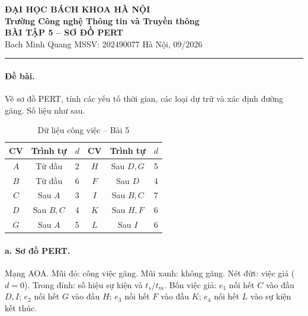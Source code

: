 \documentclass[12pt,a4paper]{article}
\begin{document}
\begin{center}
  {\large\bfseries ĐẠI HỌC BÁCH KHOA HÀ NỘI}\\[0.4pt]
  {\bfseries Trường Công nghệ Thông tin và Truyền thông}\\[3.5pt]
  {\Large\bfseries BÀI TẬP 5 -- SƠ ĐỒ PERT}\\[0.5pt]
  {\small Bach Minh Quang \quad MSSV: 202490077 \quad Hà Nội, 09/2026}
\end{center}
\vspace{-2pt}
\hrule
\vspace{5pt}

\paragraph{Đề bài.}
Vẽ sơ đồ PERT, tính các yếu tố thời gian, các loại dự trữ và xác định đường găng.
Số liệu như sau.

\begin{table}[H]\centering
\caption{Dữ liệu công việc -- Bài 5}
\small
\begin{tabular}{cccccc}
\toprule
\textbf{CV} & \textbf{Trình tự} & \textbf{$d$} &
\textbf{CV} & \textbf{Trình tự} & \textbf{$d$}\\
\midrule
$A$ & Từ đầu & 2 & $H$ & Sau $D,G$ & 5\\
$B$ & Từ đầu & 6 & $F$ & Sau $D$ & 4\\
$C$ & Sau $A$ & 3 & $I$ & Sau $B,C$ & 7\\
$D$ & Sau $B,C$ & 4 & $K$ & Sau $H,F$ & 6\\
$G$ & Sau $A$ & 5 & $L$ & Sau $I$ & 6\\
\bottomrule
\end{tabular}
\end{table}

\paragraph{a. Sơ đồ PERT.}
Mạng AOA. Mũi đỏ: công việc găng. Mũi xanh: không găng. Nét đứt: việc giả ($d=0$).
Trong đỉnh: số hiệu sự kiện và $t_s/t_m$.
Bốn việc giả: $e_1$ nối hết $C$ vào đầu $D,I$; $e_2$ nối hết $G$ vào đầu $H$;
$e_3$ nối hết $F$ vào đầu $K$; $e_4$ nối hết $L$ vào sự kiện kết thúc.
\end{document}
